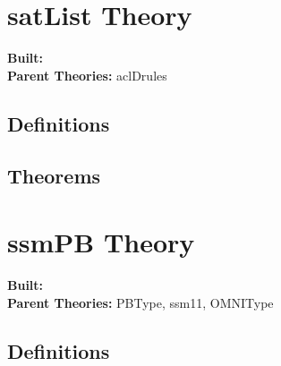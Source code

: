 \documentclass[11pt, twoside]{article}
\begin{document}
\HOLssmTheorems

\section{satList Theory}
\begin{flushleft}
\textbf{Built:} \HOLsatListDate \\[2pt]
\textbf{Parent Theories:} aclDrules
\end{flushleft}


\subsection{Definitions}

\HOLsatListDefinitions

\subsection{Theorems}

\HOLsatListTheorems


\section{ssmPB Theory}
\begin{flushleft}
\textbf{Built:} \HOLssmPBDate \\[2pt]
\textbf{Parent Theories:} PBType, ssm11, OMNIType
\end{flushleft}


\subsection{Definitions}

\HOLssmPBDefinitions
\end{document}
